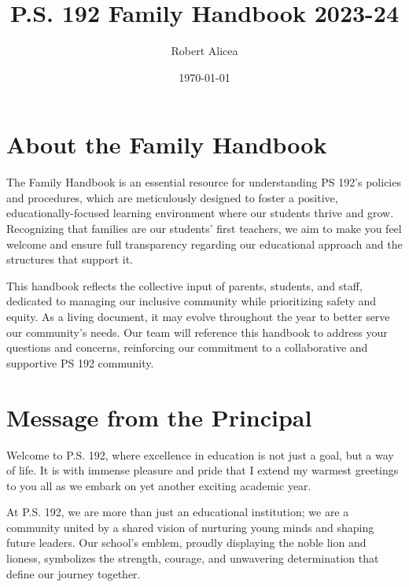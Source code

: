 \documentclass[11pt]{article}
\author{Robert Alicea}
\date{\today}
\title{P.S. 192 Family Handbook 2023-24}
\begin{document}


\pagenumbering{\fancyhf{}}
\pagestyle{headings}

\fancyhead[R]{\thepage}

\pagestyle{fancy}
\renewcommand{\footrulewidth}{1px}


\clearpage
\clearpage \tableofcontents \clearpage


\section{About the Family Handbook}
\label{sec:org1615cca}
The Family Handbook is an essential resource for understanding PS 192's policies and procedures, which are meticulously designed to foster a positive, educationally-focused learning environment where our students thrive and grow. Recognizing that families are our students' first teachers, we aim to make you feel welcome and ensure full transparency regarding our educational approach and the structures that support it.

This handbook reflects the collective input of parents, students, and staff, dedicated to managing our inclusive community while prioritizing safety and equity. As a living document, it may evolve throughout the year to better serve our community's needs. Our team will reference this handbook to address your questions and concerns, reinforcing our commitment to a collaborative and supportive PS 192 community.

\clearpage

\section{Message from the Principal}
\label{sec:org1b4edd0}

Welcome to P.S. 192, where excellence in education is not just a goal, but a way of life. It is with immense pleasure and pride that I extend my warmest greetings to you all as we embark on yet another exciting academic year.

At P.S. 192, we are more than just an educational institution; we are a community united by a shared vision of nurturing young minds and shaping future leaders. Our school’s emblem, proudly displaying the noble lion and lioness, symbolizes the strength, courage, and unwavering determination that define our journey together.
\end{document}
